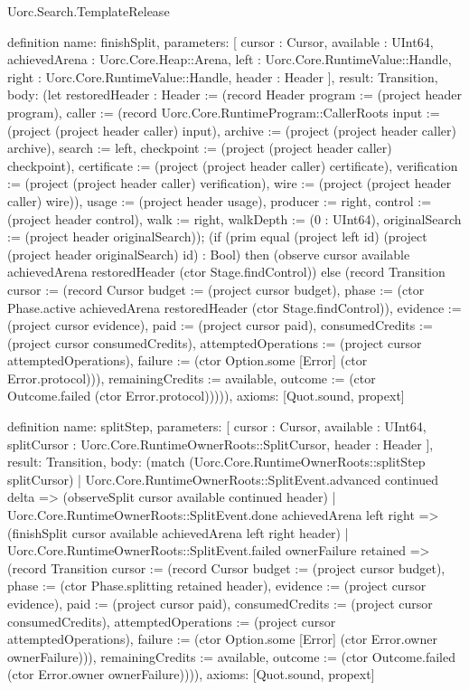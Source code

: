 \begin{lexlean}{Uorc.Search.TemplateRelease}
\begin{semanticmodule}
definition{
  name: finishSplit,
  parameters: [
    cursor : Cursor,
    available : UInt64,
    achievedArena : Uorc.Core.Heap::Arena,
    left : Uorc.Core.RuntimeValue::Handle,
    right : Uorc.Core.RuntimeValue::Handle,
    header : Header
  ],
  result: Transition,
  body: (let restoredHeader : Header := (record Header {program := (project header program), caller := (record Uorc.Core.RuntimeProgram::CallerRoots {input := (project (project header caller) input), archive := (project (project header caller) archive), search := left, checkpoint := (project (project header caller) checkpoint), certificate := (project (project header caller) certificate), verification := (project (project header caller) verification), wire := (project (project header caller) wire)}), usage := (project header usage), producer := right, control := (project header control), walk := right, walkDepth := (0 : UInt64), originalSearch := (project header originalSearch)}); (if (prim equal (project left id) (project (project header originalSearch) id) : Bool) then (observe cursor available achievedArena restoredHeader (ctor Stage.findControl)) else (record Transition {cursor := (record Cursor {budget := (project cursor budget), phase := (ctor Phase.active achievedArena restoredHeader (ctor Stage.findControl)), evidence := (project cursor evidence), paid := (project cursor paid), consumedCredits := (project cursor consumedCredits), attemptedOperations := (project cursor attemptedOperations), failure := (ctor Option.some [Error] (ctor Error.protocol))}), remainingCredits := available, outcome := (ctor Outcome.failed (ctor Error.protocol))}))),
  axioms: [Quot.sound, propext]
}

definition{
  name: splitStep,
  parameters: [
    cursor : Cursor,
    available : UInt64,
    splitCursor : Uorc.Core.RuntimeOwnerRoots::SplitCursor,
    header : Header
  ],
  result: Transition,
  body: (match (Uorc.Core.RuntimeOwnerRoots::splitStep splitCursor)
    | Uorc.Core.RuntimeOwnerRoots::SplitEvent.advanced continued delta => (observeSplit cursor available continued header)
    | Uorc.Core.RuntimeOwnerRoots::SplitEvent.done achievedArena left right => (finishSplit cursor available achievedArena left right header)
    | Uorc.Core.RuntimeOwnerRoots::SplitEvent.failed ownerFailure retained => (record Transition {cursor := (record Cursor {budget := (project cursor budget), phase := (ctor Phase.splitting retained header), evidence := (project cursor evidence), paid := (project cursor paid), consumedCredits := (project cursor consumedCredits), attemptedOperations := (project cursor attemptedOperations), failure := (ctor Option.some [Error] (ctor Error.owner ownerFailure))}), remainingCredits := available, outcome := (ctor Outcome.failed (ctor Error.owner ownerFailure))})),
  axioms: [Quot.sound, propext]
}


\end{semanticmodule}
\end{lexlean}
